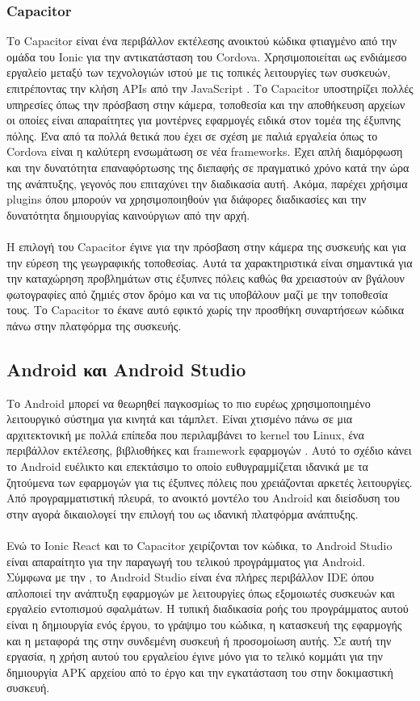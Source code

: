 \subsubsection{Capacitor}
Το Capacitor είναι ένα περιβάλλον εκτέλεσης ανοικτού κώδικα φτιαγμένο από την ομάδα του Ionic για την αντικατάσταση του Cordova. Χρησιμοποιείται ως ενδιάμεσο εργαλείο μεταξύ των τεχνολογιών ιστού με τις τοπικές λειτουργίες των συσκευών, επιτρέποντας την κλήση APIs από την JavaScript \parencite{Capacitor}. Το Capacitor υποστηρίζει πολλές υπηρεσίες όπως την πρόσβαση στην κάμερα, τοποθεσία και την αποθήκευση αρχείων οι οποίες είναι απαραίτητες για μοντέρνες εφαρμογές ειδικά στον τομέα της έξυπνης πόλης. Ένα από τα πολλά θετικά που έχει σε σχέση με παλιά εργαλεία όπως το Cordova είναι η καλύτερη ενσωμάτωση σε νέα frameworks. Έχει απλή διαμόρφωση και την δυνατότητα επαναφόρτωσης της διεπαφής σε πραγματικό χρόνο κατά την ώρα της ανάπτυξης, γεγονός που επιταχύνει την διαδικασία αυτή. Ακόμα, παρέχει χρήσιμα plugins όπου μπορούν να χρησιμοποιηθούν για διάφορες διαδικασίες και την δυνατότητα δημιουργίας καινούργιων από την αρχή.
\\
\\
Η επιλογή του Capacitor έγινε για την πρόσβαση στην κάμερα της συσκευής και για την εύρεση της γεωγραφικής τοποθεσίας. Αυτά τα χαρακτηριστικά είναι σημαντικά για την καταχώρηση προβλημάτων στις έξυπνες πόλεις καθώς θα χρειαστούν αν βγάλουν φωτογραφίες από ζημιές στον δρόμο και να τις υποβάλουν μαζί με την τοποθεσία τους. Το Capacitor το έκανε αυτό εφικτό χωρίς την προσθήκη συναρτήσεων κώδικα πάνω στην πλατφόρμα της συσκευής.

\subsection{Android και Android Studio}
Το Android μπορεί να θεωρηθεί παγκοσμίως το πιο ευρέως χρησιμοποιημένο λειτουργικό σύστημα για κινητά και τάμπλετ. Είναι χτισμένο πάνω σε μια αρχιτεκτονική με πολλά επίπεδα που περιλαμβάνει το kernel του Linux, ένα περιβάλλον εκτέλεσης, βιβλιοθήκες και framework εφαρμογών \parencite{goel2021android}. Αυτό το σχέδιο κάνει το Android ευέλικτο και επεκτάσιμο το οποίο ευθυγραμμίζεται ιδανικά με τα ζητούμενα των εφαρμογών για τις έξυπνες πόλεις που χρειάζονται αρκετές λειτουργίες. Από προγραμματιστική πλευρά, το ανοικτό μοντέλο του Android και διείσδυση του στην αγορά δικαιολογεί την επιλογή του ως ιδανική πλατφόρμα ανάπτυξης.
\\
\\
Ενώ το Ionic React και το Capacitor χειρίζονται τον κώδικα, το Android Studio είναι απαραίτητο για την παραγωγή του τελικού προγράμματος για Android. Σύμφωνα με την \textcite{thamizharasi2016android}, το Android Studio είναι ένα πλήρες περιβάλλον IDE όπου απλοποιεί την ανάπτυξη εφαρμογών με λειτουργίες όπως εξομοιωτές συσκευών και εργαλείο εντοπισμού σφαλμάτων. Η τυπική διαδικασία ροής του προγράμματος αυτού είναι η δημιουργία ενός έργου, το γράψιμο του κώδικα, η κατασκευή της εφαρμογής και η μεταφορά της στην συνδεμένη συσκευή ή προσομοίωση αυτής. Σε αυτή την εργασία, η χρήση αυτού του εργαλείου έγινε μόνο για το τελικό κομμάτι για την δημιουργία APK αρχείου από το έργο και την εγκατάσταση του στην δοκιμαστική συσκευή.  

